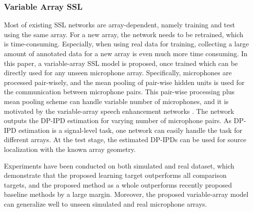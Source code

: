 \documentclass[lettersize,journal]{IEEEtran}
\begin{document}
\subsubsection{Variable Array SSL} Most of existing SSL networks are array-dependent, namely training and test using the same array. 
For a new array, the network needs to be retrained, which is time-consuming. Especially, when using real data for training, collecting a large amount of annotated data for a new array is even much more time consuming. In this paper, a variable-array SSL model is proposed, once trained which can be directly used for any unseen microphone array. Specifically, microphones are processed pair-wisely, and the mean pooling of pair-wise hidden units is used for the communication between microphone pairs. This 
pair-wise processing plus mean pooling scheme can handle variable number of microphones, and it is motivated by the variable-array speech enhancement networks \cite{luo2020end,Taherian2021OneMT,Zhang2021MicrophoneAG,Yoshioka2021VarArrayAC}. The network outputs the DP-IPD estimation for varying number of microphone pairs. As DP-IPD estimation is a signal-level task, one network can easily handle the task for different arrays. At the test stage, the estimated DP-IPDs can be used for source localization with the known array geometry. 

Experiments have been conducted on both simulated and real dataset, which demonstrate that the proposed learning target outperforms all comparison targets, and the proposed method as a whole outperforms recently proposed baseline methods by a large margin. Moreover, the proposed variable-array model can generalize well to unseen simulated and real microphone arrays. 
\end{document}

